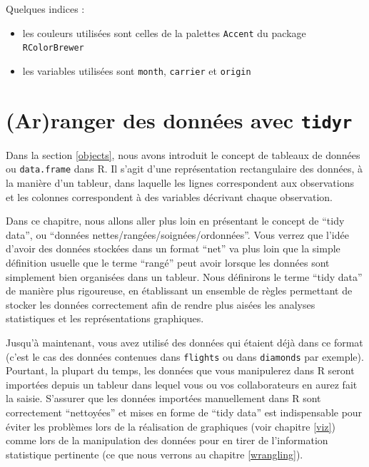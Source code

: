 \documentclass[a4paperpaper,]{article}
\providecommand{\tightlist}{%
  \setlength{\itemsep}{0pt}\setlength{\parskip}{0pt}}
\theoremstyle{definition}
\theoremstyle{definition}
\theoremstyle{definition}
\theoremstyle{remark}
\begin{document}
Quelques indices :

\begin{itemize}
\tightlist
\item
  les couleurs utilisées sont celles de la palettes \texttt{Accent} du
  package \texttt{RColorBrewer}
\item
  les variables utilisées sont \texttt{month}, \texttt{carrier} et
  \texttt{origin}
\end{itemize}

\section{\texorpdfstring{(Ar)ranger des données avec
\texttt{tidyr}}{(Ar)ranger des données avec tidyr}}\label{tidyr}

Dans la section \ref{objects}, nous avons introduit le concept de
tableaux de données ou \texttt{data.frame} dans R. Il s'agit d'une
représentation rectangulaire des données, à la manière d'un tableur,
dans laquelle les lignes correspondent aux observations et les colonnes
correspondent à des variables décrivant chaque observation.

Dans ce chapitre, nous allons aller plus loin en présentant le concept
de ``tidy data'', ou ``données nettes/rangées/soignées/ordonnées''. Vous
verrez que l'idée d'avoir des données stockées dans un format ``net'' va
plus loin que la simple définition usuelle que le terme ``rangé'' peut
avoir lorsque les données sont simplement bien organisées dans un
tableur. Nous définirons le terme ``tidy data'' de manière plus
rigoureuse, en établissant un ensemble de règles permettant de stocker
les données correctement afin de rendre plus aisées les analyses
statistiques et les représentations graphiques.

Jusqu'à maintenant, vous avez utilisé des données qui étaient déjà dans
ce format (c'est le cas des données contenues dans \texttt{flights} ou
dans \texttt{diamonds} par exemple). Pourtant, la plupart du temps, les
données que vous manipulerez dans R seront importées depuis un tableur
dans lequel vous ou vos collaborateurs en aurez fait la saisie.
S'assurer que les données importées manuellement dans R sont
correctement ``nettoyées'' et mises en forme de ``tidy data'' est
indispensable pour éviter les problèmes lors de la réalisation de
graphiques (voir chapitre \ref{viz}) comme lors de la manipulation des
données pour en tirer de l'information statistique pertinente (ce que
nous verrons au chapitre \ref{wrangling}).
\end{document}
